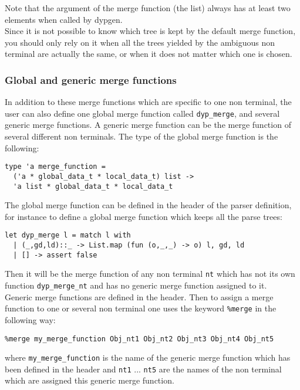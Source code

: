 \documentclass[12pt]{article}
\begin{document}
{Note that the argument of the merge function (the list) always has at least two elements when called by dypgen.\\

Since it is not possible to know which tree is kept by the default merge function, you should only rely on it when all the trees yielded by the ambiguous non terminal are actually the same, or when it does not matter which one is chosen.

\subsubsection{Global and generic merge functions}

In addition to these merge functions which are specific to one non terminal, the user can also define one global merge function called \verb|dyp_merge|, and several generic merge functions. A generic merge function can be the merge function of several different non terminals. The type of the global merge function is the following:
\begin{verbatim}
type 'a merge_function =
  ('a * global_data_t * local_data_t) list ->
  'a list * global_data_t * local_data_t
\end{verbatim}

The global merge function can be defined in the header of the parser definition, for instance to define a global merge function which keeps all the parse trees:
\begin{verbatim}
let dyp_merge l = match l with
  | (_,gd,ld)::_ -> List.map (fun (o,_,_) -> o) l, gd, ld
  | [] -> assert false
\end{verbatim}
Then it will be the merge function of any non terminal \texttt{nt} which has not its own function \verb|dyp_merge_nt| and has no generic merge function assigned to it.\\

Generic merge functions are defined in the header. Then to assign a merge function to one or several non terminal one uses the keyword \verb|%merge| in the following way:
\begin{verbatim}
%merge my_merge_function Obj_nt1 Obj_nt2 Obj_nt3 Obj_nt4 Obj_nt5
\end{verbatim}
where \verb|my_merge_function| is the name of the generic merge function which has been defined in the header and \verb|nt1| ... \verb|nt5| are the names of the non terminal which are assigned this generic merge function.\\

}
\end{document}
